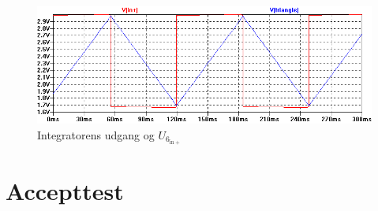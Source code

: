 \begin{figure}[h]
\centering
\includegraphics[width=\textwidth]{teknisk/volumenkontrol/vco-signal.png}
\caption{Integratorens udgang og $U_{6_{\mathrm{in+}}}$}
\label{fig:vco-signal}
\end{figure}


\section{Accepttest}
\label{volumenkontrol-accepttest}

